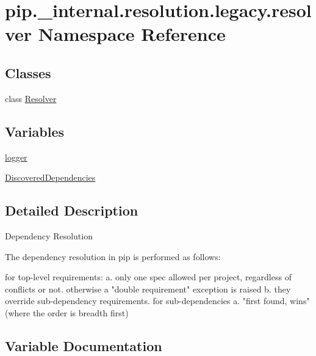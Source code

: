 \hypertarget{namespacepip_1_1__internal_1_1resolution_1_1legacy_1_1resolver}{}\section{pip.\+\_\+internal.\+resolution.\+legacy.\+resolver Namespace Reference}
\label{namespacepip_1_1__internal_1_1resolution_1_1legacy_1_1resolver}
\subsection*{Classes}
\begin{DoxyCompactItemize}
\item 
class \hyperlink{classpip_1_1__internal_1_1resolution_1_1legacy_1_1resolver_1_1Resolver}{Resolver}
\end{DoxyCompactItemize}
\subsection*{Variables}
\begin{DoxyCompactItemize}
\item 
\hyperlink{namespacepip_1_1__internal_1_1resolution_1_1legacy_1_1resolver_a3eeecbcdbf305341501fe5d777fa7f1a}{logger}
\item 
\hyperlink{namespacepip_1_1__internal_1_1resolution_1_1legacy_1_1resolver_a24fdb75b68fba6bc49a21f610ba02f30}{Discovered\+Dependencies}
\end{DoxyCompactItemize}


\subsection{Detailed Description}
\begin{DoxyVerb}Dependency Resolution

The dependency resolution in pip is performed as follows:

for top-level requirements:
    a. only one spec allowed per project, regardless of conflicts or not.
       otherwise a "double requirement" exception is raised
    b. they override sub-dependency requirements.
for sub-dependencies
    a. "first found, wins" (where the order is breadth first)
\end{DoxyVerb}
 

\subsection{Variable Documentation}
\mbox{\label{namespacepip_1_1__internal_1_1resolution_1_1legacy_1_1resolver_a24fdb75b68fba6bc49a21f610ba02f30}} 
